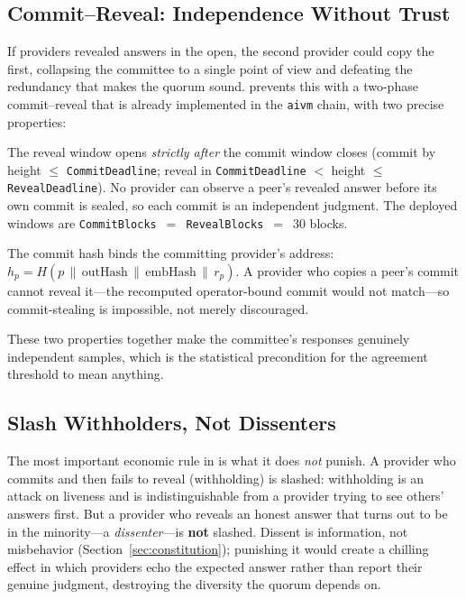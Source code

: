 \subsection{Commit--Reveal: Independence Without Trust}

If providers revealed answers in the open, the second provider could copy the first, collapsing the committee to a single point of view and defeating the redundancy that makes the quorum sound. \SCC{} prevents this with a two-phase commit--reveal that is already implemented in the \texttt{aivm} chain, with two precise properties:

\begin{description}[style=nextline,leftmargin=0pt]
\item[Sealed independence.] The reveal window opens \emph{strictly after} the commit window closes (commit by height $\le$ \texttt{CommitDeadline}; reveal in \texttt{CommitDeadline} $<$ height $\le$ \texttt{RevealDeadline}). No provider can observe a peer's revealed answer before its own commit is sealed, so each commit is an independent judgment. The deployed windows are \texttt{CommitBlocks}~$=$~\texttt{RevealBlocks}~$=$~$30$ blocks.
\item[Operator-bound commits.] The commit hash binds the committing provider's address: $h_p = H(p \,\|\, \mathrm{outHash} \,\|\, \mathrm{embHash} \,\|\, r_p)$. A provider who copies a peer's commit cannot reveal it---the recomputed operator-bound commit would not match---so commit-stealing is impossible, not merely discouraged.
\end{description}

These two properties together make the committee's responses genuinely independent samples, which is the statistical precondition for the agreement threshold to mean anything.

\subsection{Slash Withholders, Not Dissenters}

The most important economic rule in \SCC{} is what it does \emph{not} punish. A provider who commits and then fails to reveal (withholding) is slashed: withholding is an attack on liveness and is indistinguishable from a provider trying to see others' answers first. But a provider who reveals an honest answer that turns out to be in the minority---a \emph{dissenter}---is \textbf{not} slashed. Dissent is information, not misbehavior (Section~\ref{sec:constitution}); punishing it would create a chilling effect in which providers echo the expected answer rather than report their genuine judgment, destroying the diversity the quorum depends on.

